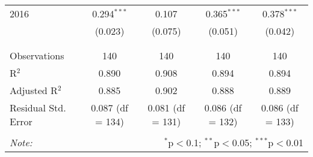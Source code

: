 \documentclass[12pt]{article}
\begin{document}
\begin{table}[H]
\begin{tabular}{@{\extracolsep{5pt}}lcccc}
			2016 & 0.294$^{***}$ & 0.107 & 0.365$^{***}$ & 0.378$^{***}$ \\ 
			& (0.023) & (0.075) & (0.051) & (0.042) \\ 
			& & & & \\ 
			\hline \\[-1.8ex] 
			Observations & 140 & 140 & 140 & 140 \\ 
			R$^{2}$ & 0.890 & 0.908 & 0.894 & 0.894 \\ 
			Adjusted R$^{2}$ & 0.885 & 0.902 & 0.888 & 0.889 \\ 
			Residual Std. Error & 0.087 (df = 134) & 0.081 (df = 131) & 0.086 (df = 132) & 0.086 (df = 133) \\ 
			\hline 
			\hline \\[-1.8ex] 
			\textit{Note:}  & \multicolumn{4}{r}{$^{*}$p$<$0.1; $^{**}$p$<$0.05; $^{***}$p$<$0.01} \\ 
		\end{tabular} 
	\end{table} 
\end{document}
